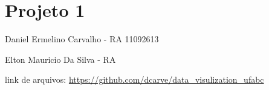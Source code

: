 





\frenchspacing 


\textual

	

	\chapter{Projeto 1}
		Daniel Ermelino Carvalho - RA 11092613
		
		Elton Mauricio Da Silva - RA 

		link de arquivos: \url{https://github.com/dcarve/data_visulization_ufabc}
	
	

	

	



\printindex




